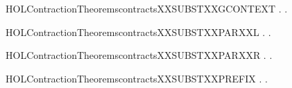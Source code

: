 \newcommand{\HOLContractionTheoremscontractsXXrules}{\UseVerbatim{HOLContractionTheoremscontractsXXrules}}
\begin{SaveVerbatim}{HOLContractionTheoremscontractsXXSUBSTXXGCONTEXT}
\HOLTokenTurnstile{} \HOLSymConst{\HOLTokenForall{}} .    \HOLSymConst{\HOLTokenImp{}} \HOLSymConst{\HOLTokenForall{}}.   \HOLSymConst{\HOLTokenImp{}}     
\end{SaveVerbatim}
\newcommand{\HOLContractionTheoremscontractsXXSUBSTXXGCONTEXT}{\UseVerbatim{HOLContractionTheoremscontractsXXSUBSTXXGCONTEXT}}
\begin{SaveVerbatim}{HOLContractionTheoremscontractsXXSUBSTXXPARXXL}
\HOLTokenTurnstile{} \HOLSymConst{\HOLTokenForall{}} .    \HOLSymConst{\HOLTokenImp{}} \HOLSymConst{\HOLTokenForall{}}.  \HOLSymConst{\ensuremath{\mid}}    \HOLSymConst{\ensuremath{\mid}} 
\end{SaveVerbatim}
\newcommand{\HOLContractionTheoremscontractsXXSUBSTXXPARXXL}{\UseVerbatim{HOLContractionTheoremscontractsXXSUBSTXXPARXXL}}
\begin{SaveVerbatim}{HOLContractionTheoremscontractsXXSUBSTXXPARXXR}
\HOLTokenTurnstile{} \HOLSymConst{\HOLTokenForall{}} .    \HOLSymConst{\HOLTokenImp{}} \HOLSymConst{\HOLTokenForall{}}.  \HOLSymConst{\ensuremath{\mid}}    \HOLSymConst{\ensuremath{\mid}} 
\end{SaveVerbatim}
\newcommand{\HOLContractionTheoremscontractsXXSUBSTXXPARXXR}{\UseVerbatim{HOLContractionTheoremscontractsXXSUBSTXXPARXXR}}
\begin{SaveVerbatim}{HOLContractionTheoremscontractsXXSUBSTXXPREFIX}
\HOLTokenTurnstile{} \HOLSymConst{\HOLTokenForall{}} .    \HOLSymConst{\HOLTokenImp{}} \HOLSymConst{\HOLTokenForall{}}. \HOLSymConst{\ensuremath{\ldotp}}  \HOLSymConst{\ensuremath{\ldotp}}
\end{SaveVerbatim}
